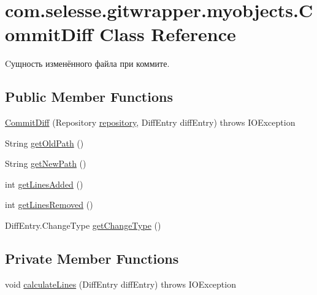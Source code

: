 \hypertarget{classcom_1_1selesse_1_1gitwrapper_1_1myobjects_1_1_commit_diff}{}\section{com.\+selesse.\+gitwrapper.\+myobjects.\+Commit\+Diff Class Reference}
\label{classcom_1_1selesse_1_1gitwrapper_1_1myobjects_1_1_commit_diff}


Cущность изменённого файла при коммите.  


\subsection*{Public Member Functions}
\begin{DoxyCompactItemize}
\item 
\hyperlink{classcom_1_1selesse_1_1gitwrapper_1_1myobjects_1_1_commit_diff_a08bf17949cc65d48f54ee30e3a42b759}{Commit\+Diff} (Repository \hyperlink{classcom_1_1selesse_1_1gitwrapper_1_1myobjects_1_1_commit_diff_a82ab668a6a057bb64cff861ed0cdd63d}{repository}, Diff\+Entry diff\+Entry)  throws I\+O\+Exception 
\item 
String \hyperlink{classcom_1_1selesse_1_1gitwrapper_1_1myobjects_1_1_commit_diff_a301cc511d088b29379be88230d6249df}{get\+Old\+Path} ()
\item 
String \hyperlink{classcom_1_1selesse_1_1gitwrapper_1_1myobjects_1_1_commit_diff_a9bc976d1c8dedcd8ff314ec3403d4c7a}{get\+New\+Path} ()
\item 
int \hyperlink{classcom_1_1selesse_1_1gitwrapper_1_1myobjects_1_1_commit_diff_ab09f25be8f406c82ae2e26889f821136}{get\+Lines\+Added} ()
\item 
int \hyperlink{classcom_1_1selesse_1_1gitwrapper_1_1myobjects_1_1_commit_diff_a377307b41a13cac2e7886320e7d60196}{get\+Lines\+Removed} ()
\item 
Diff\+Entry.\+Change\+Type \hyperlink{classcom_1_1selesse_1_1gitwrapper_1_1myobjects_1_1_commit_diff_a4c7a8245ef85e81ea1e1dae4ac3dcf90}{get\+Change\+Type} ()
\end{DoxyCompactItemize}
\subsection*{Private Member Functions}
\begin{DoxyCompactItemize}
\item 
void \hyperlink{classcom_1_1selesse_1_1gitwrapper_1_1myobjects_1_1_commit_diff_a1c992f15988559996bbbab6f54eee4ef}{calculate\+Lines} (Diff\+Entry diff\+Entry)  throws I\+O\+Exception 
\end{DoxyCompactItemize}
